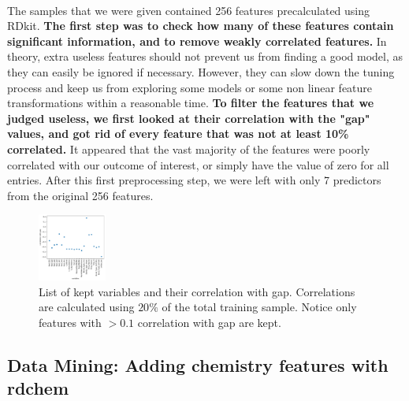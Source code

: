 \documentclass[11pt]{article}
\begin{document}
\paragraph{}
    The samples that we were given contained 256 features precalculated using RDkit.
    \textbf{The first step was to check how many of these features contain significant information, and to remove weakly correlated features.}
    In theory, extra useless features should not prevent us from finding a good model, as they can easily
    be ignored if necessary. However,
    they can slow down the tuning process and keep us from exploring some models or some non linear
    feature transformations within a reasonable time. \textbf{To filter the features that we judged useless, we first looked at their correlation with the "gap" values, and got rid of every feature that was not at least 10\% correlated.}
    It appeared that the vast majority of the features were poorly correlated with our outcome of interest, or simply have the value of zero for all entries.
    After this first preprocessing step, we were left with only 7 predictors from the original 256 features.
\begin{figure}
\centering
\includegraphics[width=0.2\textwidth]{Var-gap.pdf}
\caption{List of kept variables and their correlation with gap. Correlations are calculated using $20\%$ of the total training sample. Notice only features with $> 0.1$ correlation with gap are kept.}
\label{fig:var}
\end{figure}
  \subsection{Data Mining: Adding chemistry features with rdchem}
\end{document}
